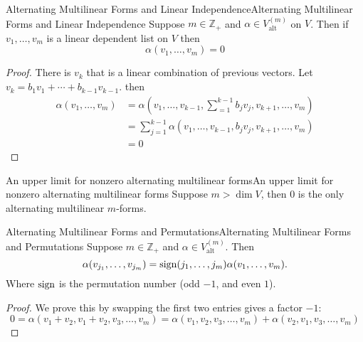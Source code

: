 \documentclass[../main.tex]{subfiles}
\begin{document}
\begin{theorem}{Alternating Multilinear Forms and Linear Independence}{Alternating Multilinear Forms and Linear Independence}
Suppose $m\in \mathbb{Z}_+$ and $\alpha\in V_{\text{alt}}^{(m)}$ on $V$. Then if $v_1, \ldots ,v_m$ is a linear dependent list on $V$ then
\begin{equation*}
\alpha(v_1, \ldots ,v_m)=0
\end{equation*}
\end{theorem}
\begin{proof}
There is $v_k$ that is a linear combination of previous vectors. Let $v_k = b_1v_1+\cdots + b _{k-1}v_{k-1}$. then
\begin{equation*}
\begin{aligned}
	\alpha(v_1, \ldots ,v_m) &= \alpha \left(v_1, \ldots ,v_{k-1}, \sum_{=1}^{k-1} b_jv_j, v_{k+1}, \ldots ,v_m\right)\\
 &= \sum_{j=1}^{k-1} \alpha(v_1, \ldots ,v_{k-1}, b_jv_j, v_{k+1}, \ldots ,v_m)\\
 &=0
\end{aligned}
\end{equation*}
\end{proof}

\begin{corollary}{An upper limit for nonzero alternating multilinear forms}{An upper limit for nonzero alternating multilinear forms}
Suppose $m >\dim V$, then $0$ is the only alternating multilinear $m$-forms.
\end{corollary}

\begin{theorem}{Alternating Multilinear Forms and Permutations}{Alternating Multilinear Forms and Permutations}
Suppose $m\in \mathbb{Z}_+$ and $\alpha\in V_{\text{alt}}^{(m)}$. Then
\begin{equation*}
\alpha(v_{j_1}, \ldots ,v_{j_m}) = \operatorname{sign}(j_1, \ldots ,j_m) \alpha(v_1, \ldots ,v_m).
\end{equation*}
Where $\operatorname{sign} $ is the permutation number (odd $-1$, and even $1$).
\end{theorem}
\begin{proof}
We prove this by swapping the first two entries gives a factor $-1$:
\begin{equation*}
0=\alpha(v_1+v_2, v_1+v_2, v_3, \ldots ,v_m) = \alpha(v_1, v_2,v_3, \ldots ,v_m) + \alpha(v_2,v_1,v_3, \ldots ,v_m)
\end{equation*}
\end{proof}
\end{document}
